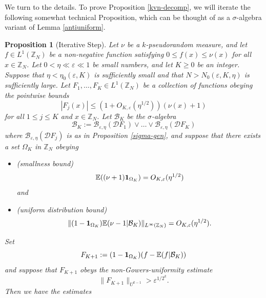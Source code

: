 \documentclass[12pt,a4paper,reqno]{amsart}
\numberwithin{equation}{section}
\theoremstyle{plain}
\newtheorem{proposition}[subsection]{Proposition}
\theoremstyle{definition}
\renewcommand{\leq}{\leqslant}
\renewcommand{\geq}{\geqslant}
\def\B{{\mathcal B}}
\def\D{{\mathcal D}}
\def\Z{{\mathbb Z}}
\def\E{{\mathbb E}}
\def\eps{{\varepsilon}}
\def\ni{\noindent}
\begin{document}
\ni We turn to the details.  To prove Proposition \ref{kvn-decomp}, we will iterate the following somewhat technical 
Proposition, which can be thought of as a $\sigma$-algebra variant of Lemma \ref{antiuniform}.

\begin{proposition}[Iterative Step]\label{relative} 
Let $\nu$ be a $k$-pseudorandom measure,
and let $f \in L^1(\Z_N)$ be a non-negative function satisfying $0 \leq f(x) \leq \nu(x)$ for all $x \in \Z_N$.
Let $0 <\eta \ll \eps \ll 1$ be small numbers, and let $K \geq 0$
be an integer.  Suppose that $\eta < \eta_0(\eps, K)$ is sufficiently small and that $N > N_0(\eps, K,\eta)$ is sufficiently large.
Let $F_1,\ldots,F_K \in L^1(\Z_N)$ be a collection of functions
obeying the pointwise bounds
\begin{equation}\label{f-disc-ok}
 |F_{j}(x)| \leq (1 + O_{K,\eps}(\eta^{1/2})) (\nu(x) + 1)
\end{equation}
for all $1 \leq j \leq K$ and $x \in \Z_N$.  Let $\B_K$ be the $\sigma$-algebra
\begin{equation}\label{BK-def}
 \B_K :=  \B_{\eps,\eta}(\D F_1) \vee \ldots \vee \B_{\eps,\eta}(\D F_K)
 \end{equation}
where $\B_{\eps,\eta}(\D F_j)$ is as in Proposition \ref{sigma-gen}, and suppose that there exists a set $\Omega_K$ in $\Z_N$
obeying 
\begin{itemize}
\item \textup{(}smallness bound\textup{)}
\begin{equation}\label{om-small} \E( (\nu + 1) {\bf 1}_{\Omega_K} ) = O_{K,\eps}(\eta^{1/2})
\end{equation}
and \item \textup{(}uniform distribution bound\textup{)}
\begin{equation}\label{uniform-dist}
\| (1 - {\bf 1}_{\Omega_{K}}) \E( \nu - 1 | \B_{K} )\|_{L^\infty(\Z_N)} = O_{K,\eps}(\eta^{1/2}).
\end{equation}
\end{itemize}
Set
\begin{equation}\label{FK1-def}
F_{K+1} := (1 - {\bf 1}_{\Omega_K}) (f - \E(f|\B_K))
\end{equation}
and suppose that $F_{K+1}$ obeys the non-Gowers-uniformity estimate
\begin{equation}\label{non-terminate}
 \| F_{K+1} \|_{U^{k-1}} > \eps^{1/2^k}.
\end{equation}
Then we have the estimates
\begin{equation}\label{fbk-bound}

\end{equation}
\end{proposition}
\end{document}
